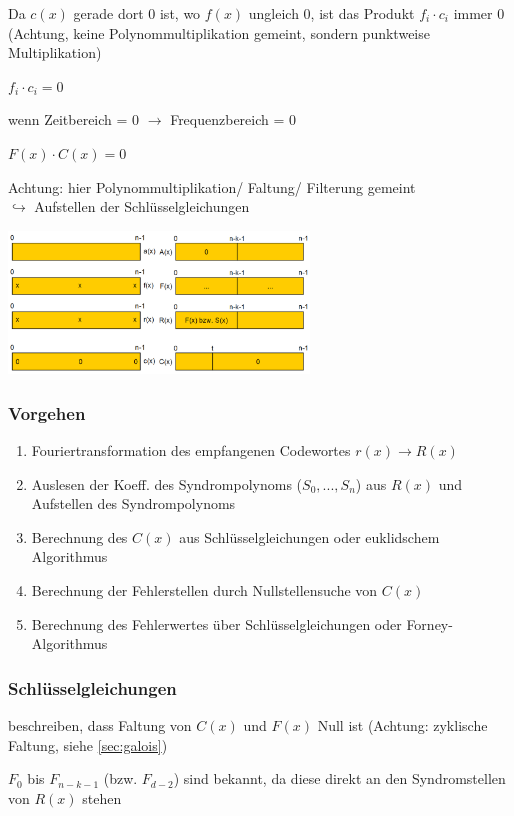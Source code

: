 Da $c(x)$ gerade dort 0 ist, wo $f(x)$ ungleich 0, ist das Produkt $f_i \cdot c_i$ immer 0 (Achtung, keine
Polynommultiplikation gemeint, sondern punktweise Multiplikation)

$\displaystyle{
    f_i \cdot c_i = 0
}$

wenn Zeitbereich = 0 $\rightarrow$ Frequenzbereich = 0

$\displaystyle{
    F(x) \cdot C(x) = 0
}$

Achtung: hier Polynommultiplikation/ Faltung/ Filterung gemeint\\
$\hookrightarrow$ Aufstellen der Schlüsselgleichungen

\includegraphics[width=8cm]{img/decod_rs.PNG}

\subsubsection{Vorgehen}

\begin{enumerate}
    \item Fouriertransformation des empfangenen Codewortes $r(x) \rightarrow R(x)$
    \item Auslesen der Koeff. des Syndrompolynoms ($S_0, ..., S_n$) aus $R(x)$ und Aufstellen des Syndrompolynoms
    \item Berechnung des $C(x)$ aus Schlüsselgleichungen oder euklidschem Algorithmus
    \item Berechnung der Fehlerstellen durch Nullstellensuche von $C(x)$
    \item Berechnung des Fehlerwertes über Schlüsselgleichungen oder Forney-Algorithmus
\end{enumerate}

\subsubsection{Schlüsselgleichungen}

beschreiben, dass Faltung von $C(x)$ und $F(x)$ Null ist (Achtung: zyklische Faltung, siehe \autoref{sec:galois})

$F_0$ bis $F_{n-k-1}$ (bzw. $F_{d-2}$) sind bekannt, da diese direkt an den Syndromstellen
von $R(x)$ stehen

